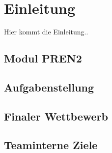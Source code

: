 \section{Einleitung}
Hier kommt die Einleitung..

\subsection{Modul PREN2}

\subsection{Aufgabenstellung}

\subsection{Finaler Wettbewerb}

\subsection{Teaminterne Ziele}

\newpage